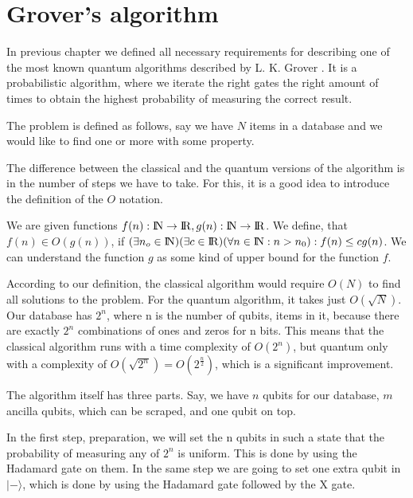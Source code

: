 \chapter{Grover's algorithm}
In previous chapter we defined all necessary requirements for describing one of the most known quantum algorithms described by L. K. Grover \cite{grover1996fast}. It is a probabilistic algorithm, where we iterate the right gates the right amount of times to obtain the highest probability of measuring the correct result.

The problem is defined as follows, say we have $N$ items in a database and we would like to find one or more with some property. 

The difference between the classical and the quantum versions of the algorithm is in the number of steps we have to take. For this, it is a good idea to introduce the definition of the $O$ notation.

We are given functions $f(n): {\rm I\!N} \rightarrow {\rm I\!R}, g(n): {\rm I\!N} \rightarrow {\rm I\!R}$. 
\newline
We define, that $f(n) \in O(g(n))$, if $ (\exists n_o \in {\rm I\!N})(\exists c \in {\rm I\!R})(\forall n \in {\rm I\!N} : n > n_0) : f(n) \le cg(n)$. We can understand the function $g$ as some kind of upper bound for the function $f$.

According to our definition, the classical algorithm would require $O(N)$ to find all solutions to the problem. For the quantum algorithm, it takes just $O(\sqrt{N})$. Our database has $2^n$, where n is the number of qubits, items in it, because there are exactly $2^n$ combinations of ones and zeros for n bits. This means that the classical algorithm runs with a time complexity of $O(2^n)$, but quantum only with a complexity of $O(\sqrt{2^n}) = O(2^{\frac{n}{2}})$, which is a significant improvement.

The algorithm itself has three parts. Say, we have $n$ qubits for our database, $m$ ancilla qubits, which can be scraped, and one qubit on top. 

In the first step, preparation, we will set the n qubits in such a state that the probability of measuring any of $2^n$ is uniform. This is done by using the Hadamard gate on them. In the same step we are going to set one extra qubit in $|-\rangle$, which is done by using the Hadamard gate followed by the X gate.
